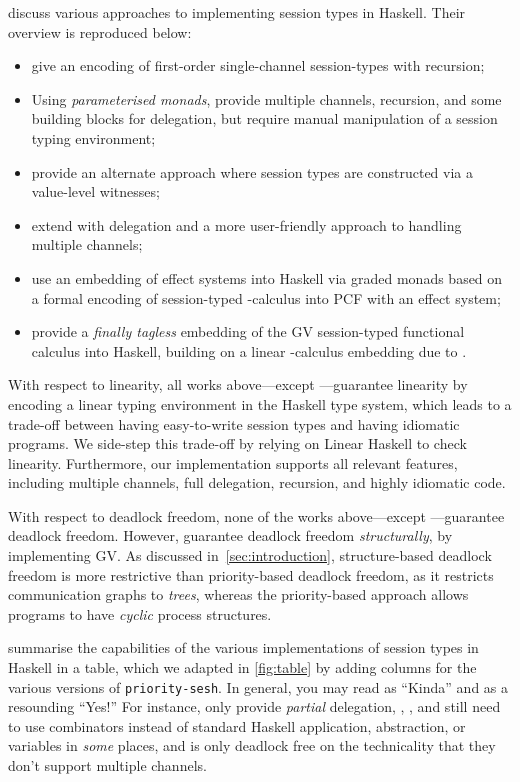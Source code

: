 \documentclass[sigplan,screen]{acmart}
\begin{document}
\citet{orchardyoshida17} discuss various approaches to implementing session types in Haskell. Their overview is reproduced below:
\begin{itemize}
\item
  \citet{neubauerthiemann04} give an encoding of first-order single-channel session-types with recursion;
\item
  Using \emph{parameterised monads}, \citet{pucellatov08} provide multiple channels, recursion, and some building blocks for delegation, but require manual manipulation of a session typing environment;
\item
  \citet{sackmaneisenbach08} provide an alternate approach where session types are constructed via a value-level witnesses;
\item
  \citet{imaiyuen10} extend \citet{pucellatov08} with delegation and a more user-friendly approach to handling multiple channels;
\item
  \citet{orchardyoshida16} use an embedding of effect systems into Haskell via graded monads based on a formal encoding of session-typed \textpi-calculus into PCF with an effect system;
\item
  \citet{lindleymorris16} provide a \emph{finally tagless} embedding of the GV session-typed functional calculus into Haskell, building on a linear \textlambda-calculus embedding due to \citet{polakow15}.
\end{itemize}
With respect to linearity, all works above---except \citet{neubauerthiemann04}---guarantee linearity by encoding a linear typing environment in the Haskell type system, which leads to a trade-off between having easy-to-write session types and having idiomatic programs.
We side-step this trade-off by relying on Linear Haskell to check linearity. Furthermore, our implementation supports all relevant features, including multiple channels, full delegation, recursion, and highly idiomatic code.

With respect to deadlock freedom, none of the works above---except \citet{lindleymorris16}---guarantee deadlock freedom. However, \citet{lindleymorris16} guarantee deadlock freedom \emph{structurally}, by implementing GV. As discussed in~\cref{sec:introduction}, structure-based deadlock freedom is more restrictive than priority-based deadlock freedom, as it restricts communication graphs to \emph{trees}, whereas the priority-based approach allows programs to have \emph{cyclic} process structures.

\citet{orchardyoshida17} summarise the capabilities of the various implementations of session types in Haskell in a table, which we adapted in \cref{fig:table} by adding columns for the various versions of \texttt{priority-sesh}. In general, you may read \kinda as ``Kinda'' and  as a resounding ``Yes!'' For instance, \citet{pucellatov08} only provide \emph{partial} delegation, \citet{neubauerthiemann04}, \citet{pucellatov08}, and \citet{lindleymorris16} still need to use combinators instead of standard Haskell application, abstraction, or variables in \emph{some} places, and \citet{neubauerthiemann04} is only deadlock free on the technicality that they don't support multiple channels.
\end{document}
